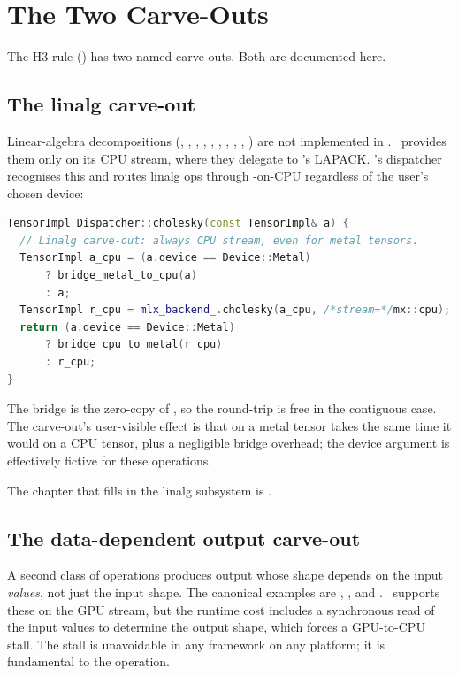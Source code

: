 \section{The Two Carve-Outs}
\label{sec:backend_dispatch:carveouts}

The H3 rule () has two named carve-outs.
Both are documented here.

\subsection{The linalg carve-out}
\label{ssec:backend_dispatch:linalg_carveout}

Linear-algebra decompositions (, ,
, , , , ,
, , ) are not implemented
in \Metal. \MLX\ provides them only on its CPU stream, where they
delegate to \Accelerate's LAPACK. \Lucid's dispatcher recognises
this and routes linalg ops through \MLX-on-CPU regardless of the
user's chosen device:

\begin{lstlisting}[style=lucidcpp,language=C++]
TensorImpl Dispatcher::cholesky(const TensorImpl& a) {
  // Linalg carve-out: always CPU stream, even for metal tensors.
  TensorImpl a_cpu = (a.device == Device::Metal)
      ? bridge_metal_to_cpu(a)
      : a;
  TensorImpl r_cpu = mlx_backend_.cholesky(a_cpu, /*stream=*/mx::cpu);
  return (a.device == Device::Metal)
      ? bridge_cpu_to_metal(r_cpu)
      : r_cpu;
}
\end{lstlisting}

The bridge is the zero-copy  of
, so the round-trip is free in the
contiguous case. The carve-out's user-visible effect is that
 on a metal tensor takes the same
time it would on a CPU tensor, plus a negligible bridge overhead;
the device argument is effectively fictive for these operations.

The chapter that fills in the linalg subsystem is
.

\subsection{The data-dependent output carve-out}
\label{ssec:backend_dispatch:data_dep_carveout}

A second class of operations produces output whose shape depends on
the input \emph{values}, not just the input shape. The canonical
examples are , , and
. \MLX\ supports these on the GPU
stream, but the runtime cost includes a synchronous read of the
input values to determine the output shape, which forces a
GPU-to-CPU stall. The stall is unavoidable in any framework on any
platform; it is fundamental to the operation.


